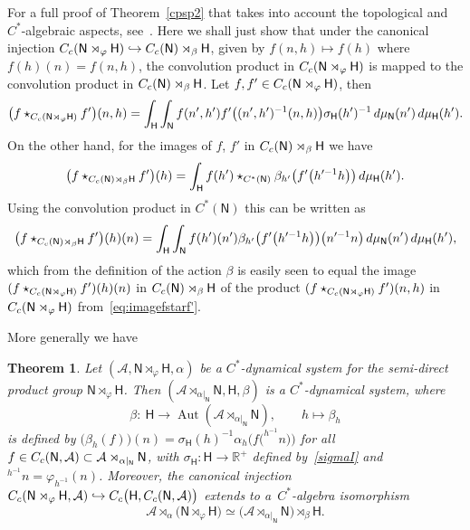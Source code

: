 \documentclass[11pt]{article}
\numberwithin{equation}{section}
\numberwithin{equation}{section}
\def\dd{{\rm d}}
\newcommand{\sfH}{\mathsf{H}}
\newcommand{\sfN}{\mathsf{N}}
\newcommand{\Aut}{\operatorname{Aut}}
\newcommand{\real}{{\mathbb R}} %
\def\alg{{\mathcal A}}
\newtheorem{Theorem}{Theorem}[section]
\begin{document}
For a full
proof of Theorem~\ref{cpsp2} that takes into account the topological
and $C^*$-algebraic aspects, see~\cite[Proposition~3.11]{Williams2007}. Here
we shall just show that under the canonical injection $C_{\rm c}(\sfN \rtimes_\varphi \sfH )\hookrightarrow
C_{\rm c}(\sfN )\rtimes_\beta \sfH $, given by $f(n,h)\mapsto f(h)$ where
$f(h)(n)=f(n,h)$, the convolution product in $C_{\rm c}(\sfN \rtimes_\varphi
\sfH )$ is mapped to the convolution product in $C_{\rm c}(\sfN )\rtimes_\beta \sfH $.
Let $f,f'\in C_{\rm c}(\sfN \rtimes_\varphi \sfH )$, then
\begin{gather}\label{eq:imagefstarf'}
\big(f\star_{C_{\rm c}(\sfN \rtimes_\varphi
 \sfH )}f'\big)(n,h)=\int_\sfH \int_\sfN f(n',h')
f'\big((n',h')^{-1} (n,h)\big) \sigma_\sfH(h')^{-1} \, \dd\mu_\sfN (n') \, \dd\mu_\sfH (h').
\end{gather}
On the other hand, for the images of $f$, $f'$ in $C_{\rm c}(\sfN
)\rtimes_\beta \sfH $ we have
\[
\big(f\star_{C_{\rm c}(\sfN )\rtimes_\beta
 \sfH }f'\big)(h)=\int_\sfH f(h')\star_{C^*(\sfN
 )}\beta_{h'}\big(f'\big(h'^{-1} h\big)\big) \, \dd\mu_\sfH (h') .
\]
Using the convolution product in $C^*(\sfN)$ this can be written as
\begin{align*}
\big(f\star_{C_{\rm c}(\sfN )\rtimes_\beta
 \sfH }f'\big)(h)(n)=\int_\sfH \int_\sfN
 f(h')(n') \beta_{h'}\big(f'\big(h'^{-1} h\big)\big)\big(n'^{-1} n\big)
\, \dd\mu_\sfN (n') \, \dd\mu_\sfH (h') ,
\end{align*}
which from the definition of the action $\beta$ is easily seen to
equal the image $(f\star_{C_{\rm c}(\sfN \rtimes_\varphi \sfH
 )}f')(h)(n)$ in $C_{\rm c}(\sfN )\rtimes_\beta
 \sfH $ of the product $(f\star_{C_{\rm c}(\sfN \rtimes_\varphi
 \sfH )}f')(n,h)$ in $C_{\rm c}(\sfN \rtimes_\varphi
\sfH )$ from~\eqref{eq:imagefstarf'}.

More generally we have~\cite[Proposition~3.11]{Williams2007}
\begin{Theorem}\label{cpsp3}
Let $(\alg,\sfN \rtimes_\varphi \sfH ,\alpha)$ be a $C^*$-dynamical
system for the semi-direct product group $\sfN \rtimes_\varphi \sfH $. Then $(\alg\rtimes_{\alpha|_\sfN }\sfN ,\sfH ,\beta)$ is a $C^*$-dynamical
system, where
\[
\beta\colon \ \sfH \longrightarrow \Aut(\alg\rtimes_{\alpha|_\sfN }\sfN ) ,
\qquad h\longmapsto \beta_h
\]
is defined by
$\big(\beta_h(f)\big)(n)=\sigma_\sfH(h)^{-1} \alpha_h\big(f\big(^{h^{-1\!}}n\big)\big)$
for all $f\in C_{\rm c}(\sfN ,\alg)\subset \alg\rtimes_{\alpha|_\sfN }\sfN $, with $\sigma_\sfH\colon
\sfH \to \real^+$ defined by~\eqref{sigmaI} and $^{h^{-1\!}}n=\varphi_{h^{-1}}(n)$.
Moreover, the canonical injection $C_{\rm c}(\sfN \rtimes_\varphi \sfH ,\alg)\hookrightarrow
C_{\rm c}\big(\sfH ,C_{\rm c}(\sfN ,\alg)\big)$
extends to a~$C^*$-algebra isomorphism
\[
\alg\rtimes_{\alpha}\big(\sfN \rtimes_\varphi
\sfH \big) \simeq \big(\alg\rtimes_{\alpha|_\sfN } \sfN
\big)\rtimes_\beta \sfH .
\]
\end{Theorem}
\end{document}
